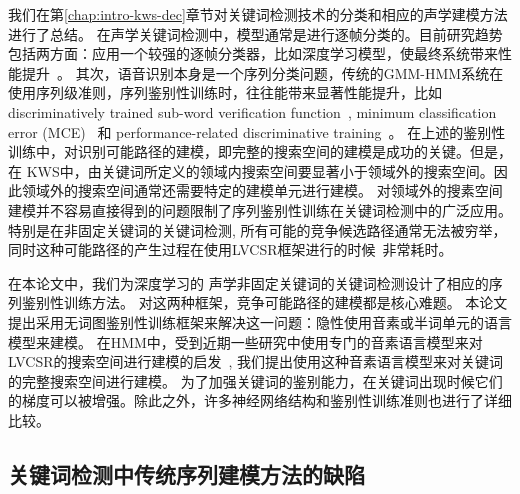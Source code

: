 我们在第\ref{chap:intro-kws-dec}章节对关键词检测技术的分类和相应的声学建模方法进行了总结。
%
在声学关键词检测中，模型通常是进行逐帧分类的。目前研究趋势包括两方面：应用一个较强的逐帧分类器，比如深度学习模型，使最终系统带来性能提升~\cite{chen2014small,sainath2015convolutional}。 其次，语音识别本身是一个序列分类问题，传统的GMM-HMM系统在使用序列级准则，序列鉴别性训练时，往往能带来显著性能提升，比如discriminatively trained sub-word verification function~\cite{sukkar1996vocabulary}, minimum classification error (MCE)~\cite{sandness2000keyword} 和 performance-related discriminative training~\cite{keshet2009discriminative}。
在上述的鉴别性训练中，对识别可能路径的建模，即完整的搜索空间的建模是成功的关键。但是，在 KWS中，由关键词所定义的领域内搜索空间要显著小于领域外的搜索空间。因此领域外的搜索空间通常还需要特定的建模单元进行建模。
对领域外的搜素空间建模并不容易直接得到的问题限制了序列鉴别性训练在关键词检测中的广泛应用。
特别是在非固定关键词的关键词检测, 所有可能的竞争候选路径通常无法被穷举，同时这种可能路径的产生过程在使用LVCSR框架进行的时候~\cite{povey2005discriminative}非常耗时。 

在本论文中，我们为深度学习的 声学非固定关键词的关键词检测设计了相应的序列鉴别性训练方法。
%
对这两种框架，竞争可能路径的建模都是核心难题。
本论文提出采用无词图鉴别性训练框架来解决这一问题：隐性使用音素或半词单元的语言模型来建模。
在HMM中，受到近期一些研究中使用专门的音素语言模型来对LVCSR的搜索空间进行建模的启发~\cite{povey2016purely,chen2006advances},  我们提出使用这种音素语言模型来对关键词的完整搜索空间进行建模。
为了加强关键词的鉴别能力，在关键词出现时候它们的梯度可以被增强。除此之外，许多神经网络结构和鉴别性训练准则也进行了详细比较。



\subsection{关键词检测中传统序列建模方法的缺陷}

